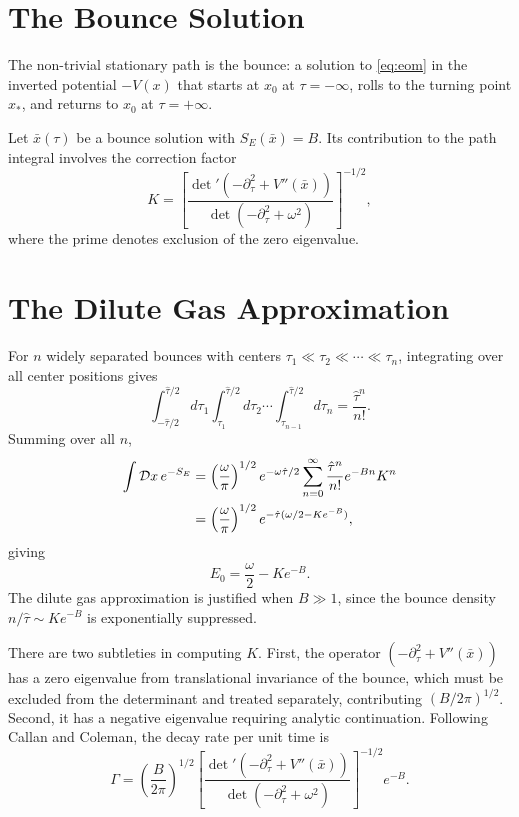 \section{The Bounce Solution}

The non-trivial stationary path is the bounce: a solution to
\eqref{eq:eom} in the inverted potential $-V(x)$ that starts at $x_0$
at $\tau = -\infty$, rolls to the turning point $x_*$, and returns to
$x_0$ at $\tau = +\infty$.

Let $\bar x(\tau)$ be a bounce solution with $S_E(\bar x) = B$.
Its contribution to the path integral involves the correction factor
\begin{equation}
	K = \left[\frac{\det'(-\partial_\tau^2 + V''(\bar x))}
		{\det(-\partial_\tau^2 + \omega^2)}\right]^{-1/2},
\end{equation}
where the prime denotes exclusion of the zero eigenvalue.

\section{The Dilute Gas Approximation}

For $n$ widely separated bounces with centers
$\tau_1 \ll \tau_2 \ll \cdots \ll \tau_n$, integrating over all
center positions gives
\begin{equation}
	\int_{-\hat\tau/2}^{\hat\tau/2}d\tau_1
	\int_{\tau_1}^{\hat\tau/2}d\tau_2\cdots
	\int_{\tau_{n-1}}^{\hat\tau/2}d\tau_n
	= \frac{\hat\tau^n}{n!}.
\end{equation}
Summing over all $n$,
\begin{align}
	\int\mathcal{D}x\,e^{-S_E}
	 & = \left(\frac{\omega}{\pi}\right)^{1/2}e^{-\omega\hat\tau/2}
	\sum_{n=0}^{\infty}\frac{\hat\tau^n}{n!}e^{-Bn}K^n \notag       \\
	 & = \left(\frac{\omega}{\pi}\right)^{1/2}
	e^{-\hat\tau(\omega/2 - Ke^{-B})},
\end{align}
giving
\begin{equation}
	\boxed{E_0 = \frac{\omega}{2} - Ke^{-B}.}
\end{equation}
The dilute gas approximation is justified when $B \gg 1$, since the
bounce density $n/\hat\tau \sim Ke^{-B}$ is exponentially suppressed.

There are two subtleties in computing $K$. First, the operator
$(-\partial_\tau^2 + V''(\bar x))$ has a zero eigenvalue from
translational invariance of the bounce, which must be excluded from
the determinant and treated separately, contributing $(B/2\pi)^{1/2}$.
Second, it has a negative eigenvalue requiring analytic continuation.
Following Callan and Coleman, the decay rate per unit time is
\begin{equation}
	\Gamma = \left(\frac{B}{2\pi}\right)^{1/2}
	\left[\frac{\det'(-\partial_\tau^2+V''(\bar x))}
		{\det(-\partial_\tau^2+\omega^2)}\right]^{-1/2}e^{-B}.
\end{equation}

